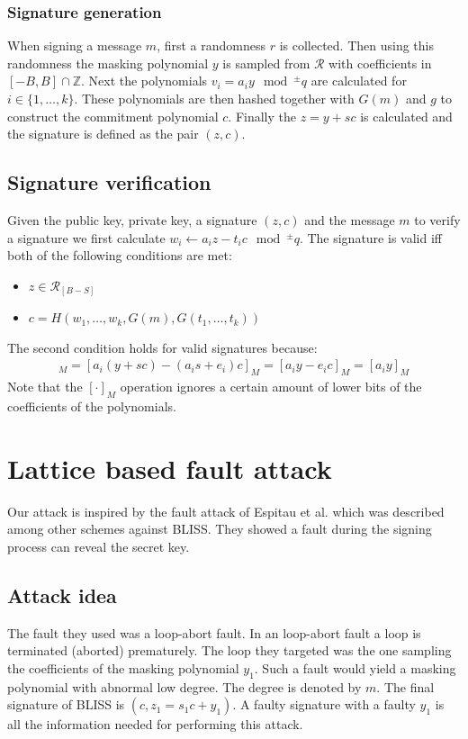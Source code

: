 \documentclass[a4paper,titlepage]{article}
\begin{document}
\subsubsection{Signature generation}
When signing a message $m$, first a randomness $r$ is collected. Then using this randomness the masking polynomial $y$ is sampled from $\mathcal{R}$ with coefficients in $[-B,B] \cap \mathds{Z}$.
Next the polynomials $v_{i} = a_{i}y \mod^{\pm} q$ are calculated for $i \in \{1, \ldots, k\}$. These polynomials are then hashed together with $G(m)$ and $g$ to construct the commitment polynomial $c$. Finally the $z = y + sc$ is calculated and the signature is defined as the pair $(z, c)$.

\subsection{Signature verification}
Given the public key, private key, a signature $(z, c)$ and the message $m$ to verify a signature we first calculate $w_{i} \leftarrow a_{i} z - t_{i} c \mod^{\pm} q$.
The signature is valid iff both of the following conditions are met:
\begin{itemize}
	\item $z \in \mathcal{R}_{[B-S]}$
	\item $c = H(w_{1}, \ldots, w_{k}, G(m), G(t_{1}, \ldots, t_{k}))$ 
\end{itemize} 

The second condition holds for valid signatures because: \cite[p. 10]{qtesla} %
\begin{align}
	[a_{i}z-t_{i}c]_{M} = [a_{i}(y+sc) - (a_{i}s+e_{i})c]_{M} = [a_{i}y - e_{i} c]_{M} = [a_{i}y]_{M}
\end{align}
Note that the $[\cdot]_{M}$ operation ignores a certain amount of lower bits of the coefficients of the polynomials.


\section{Lattice based fault attack}
Our attack is inspired by the fault attack of Espitau et al. \cite{espitau} which was described among other schemes against BLISS. They showed a fault during the signing process can reveal the secret key.

\subsection{Attack idea}
The fault they used was a loop-abort fault. In an loop-abort fault a loop is terminated (aborted) prematurely. The loop they targeted was the one sampling the coefficients of the masking polynomial $y_1$. Such a fault would yield a masking polynomial with abnormal low degree. The degree is denoted by $m$. The final signature of BLISS is $(c, z_1 = s_1 c + y_1)$. A faulty signature with a faulty $y_1$ is all the information needed for performing this attack.
\end{document}
